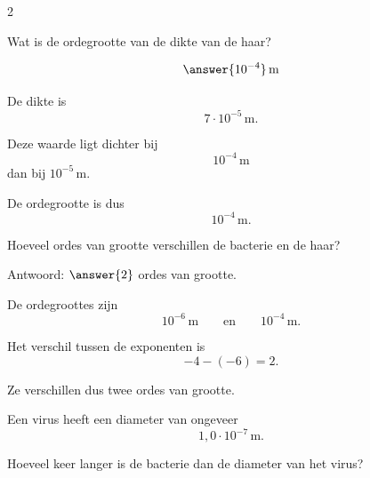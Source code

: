 \documentclass{ximera}
\begin{document}
\begin{oefening}{\oefU}
\begin{multicols}{2}
                
                \begin{question}
                Wat is de ordegrootte van de dikte van de haar?
                
                \[
                \answer{10^{-4}}\,\mathrm m
                \]
                
                \begin{oplossing}
                De dikte is
                \[
                7\cdot10^{-5}\,\mathrm m.
                \]
                
                Deze waarde ligt dichter bij
                \[
                10^{-4}\,\mathrm m
                \]
                dan bij $10^{-5}\,\mathrm m$.
                
                De ordegrootte is dus
                \[
                10^{-4}\,\mathrm m.
                \]
                \end{oplossing}
                \end{question}
                
                
                \begin{question}
                Hoeveel ordes van grootte verschillen de bacterie en de haar?
                
                Antwoord: $\answer{2}$ ordes van grootte.
                
                \begin{oplossing}
                De ordegroottes zijn
                \[
                10^{-6}\,\mathrm m
                \qquad\text{en}\qquad
                10^{-4}\,\mathrm m.
                \]
                
                Het verschil tussen de exponenten is
                \[
                -4-(-6)=2.
                \]
                
                Ze verschillen dus twee ordes van grootte.
                \end{oplossing}
                \end{question}
                
                
                \begin{question}
                Een virus heeft een diameter van ongeveer
                \[
                1{,}0\cdot10^{-7}\,\mathrm m.
                \]
                
                Hoeveel keer langer is de bacterie dan de diameter van het virus?
                

\end{question}
\end{multicols}
\end{oefening}
\end{document}
